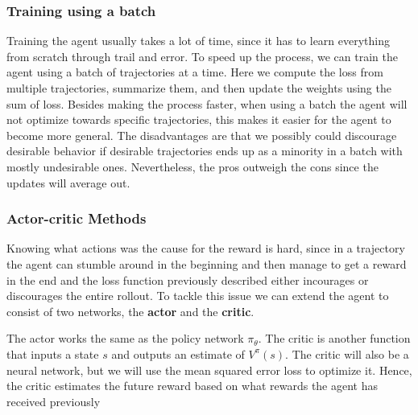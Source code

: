 \documentclass[12pt,A4]{report}
\theoremstyle{definition}
\begin{document}
\subsubsection{Training using a batch}

Training the agent usually takes a lot of time, since it has to learn everything from scratch through trail and error. To speed up the process, we can train the agent using a batch of trajectories at a time. Here we compute the loss from multiple trajectories, summarize them, and then update the weights using the sum of loss. Besides making the process faster, when using a batch the agent will not optimize towards specific trajectories, this makes it easier for the agent to become more general. The disadvantages are that we possibly could discourage desirable behavior if desirable trajectories ends up as a minority in a batch with mostly undesirable ones. Nevertheless, the pros outweigh the cons since the updates will average out.


\subsubsection{Actor-critic Methods}
Knowing what actions was the cause for the reward is hard, since in a trajectory the agent can stumble around in the beginning and then manage to get a reward in the end and the loss function previously described either incourages or discourages the entire rollout. To tackle this issue we can extend the agent to consist of two networks, the \textbf{actor} and the \textbf{critic}. 

The actor works the same as the policy network $\pi_\theta$. The critic is another function that inputs a state $s$ and outputs an estimate of $V^\pi(s)$. The critic will also be a neural network, but we will use the mean squared error loss to optimize it. Hence, the critic estimates the future reward based on what rewards the agent has received previously
\end{document}
